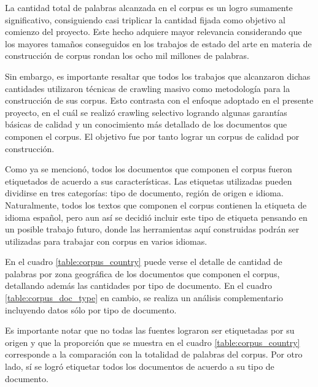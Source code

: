 La cantidad total de palabras alcanzada en el corpus es un logro sumamente significativo,
consiguiendo casi triplicar la cantidad fijada como objetivo al comienzo del proyecto. Este hecho
adquiere mayor relevancia considerando que los mayores tamaños conseguidos en los
trabajos de estado del arte en materia de construcción de corpus rondan los ocho mil
millones de palabras.

Sin embargo, es importante resaltar que todos los trabajos que alcanzaron dichas cantidades
utilizaron técnicas de crawling masivo como metodología para la construcción de sus corpus. Esto
contrasta con el enfoque adoptado en el presente proyecto, en el cuál se realizó crawling
selectivo logrando algunas garantías básicas de calidad y un conocimiento más detallado
de los documentos que componen el corpus. El objetivo fue por tanto lograr un corpus de
calidad por construcción.

Como ya se mencionó, todos los documentos que componen el corpus fueron etiquetados de
acuerdo a sus características. Las etiquetas utilizadas pueden dividirse en tres categorías:
tipo de documento, región de origen e idioma. Naturalmente, todos los textos que componen
el corpus contienen la etiqueta de idioma español, pero aun así se decidió incluir este tipo de
etiqueta pensando en un posible trabajo futuro, donde las herramientas aquí construidas podrán
ser utilizadas para trabajar con corpus en varios idiomas.

En el cuadro \ref{table:corpus_country} puede verse el detalle de cantidad de palabras por
zona geográfica de los documentos que componen el corpus, detallando además las
cantidades por tipo de documento. En el cuadro \ref{table:corpus_doc_type} en cambio, se
realiza un análisis complementario incluyendo datos sólo por tipo de documento.

Es importante notar que no todas las fuentes lograron ser etiquetadas por su origen y que la
proporción que se muestra en el cuadro \ref{table:corpus_country} corresponde a la comparación
con la totalidad de palabras del corpus. Por otro lado, sí se logró etiquetar todos los documentos
de acuerdo a su tipo de documento.

